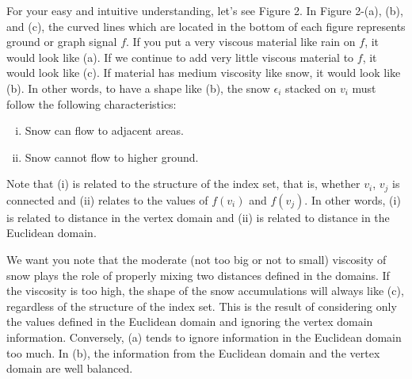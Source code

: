 \documentclass[preprint, review, 12pt]{article}
\theoremstyle{definition}
\theoremstyle{remark}
\begin{document}
For your easy and intuitive understanding, let's see Figure 2. In Figure 2-(a), (b), and (c), the curved lines which are located in the bottom of each figure represents ground or graph signal $f$. If you put a very viscous material like rain on $f$, it would look like (a). If we continue to add very little viscous material to $f$, it would look like (c). If material has medium viscosity like snow, it would look like (b).  In other words, to have a shape like (b), the snow $\epsilon_i$ stacked on $v_i$ must follow the following characteristics: 
\begin{enumerate}[(i)]
\item Snow can flow to adjacent areas.
\item Snow cannot flow to higher ground. 
\end{enumerate}
Note that (i) is related to the structure of the index set, that is, whether $v_i$, $v_j$ is connected and (ii) relates to the values of $f(v_i)$ and $f (v_j)$. In other words, (i) is related to distance in the vertex domain and (ii) is related to distance in the Euclidean domain. 

We want you note that the moderate (not too big or not to small) viscosity of snow plays the role of properly mixing two distances defined in the domains. If the viscosity is too high, the shape of the snow accumulations will always like (c), regardless of the structure of the index set. This is the result of considering only the values defined in the Euclidean domain and ignoring the vertex domain information. Conversely, (a) tends to ignore information in the Euclidean domain too much. In (b), the information from the Euclidean domain and the vertex domain are well balanced.
\end{document}
